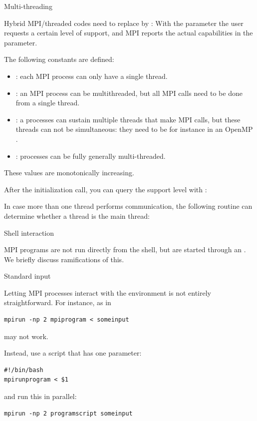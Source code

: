  {Multi-threading}
\label{sec:ref:mpi-thread}

Hybrid MPI/threaded codes need to replace 
by :
%
%
With the  parameter the user requests a certain level of support,
and MPI reports the actual capabilities in the  parameter.

The following constants are defined:
\begin{itemize}
\item {}: each MPI process can only have
  a single thread.
\item {}: an MPI process can be
  multithreaded, but all MPI calls need to be done from a single
  thread.
\item {}: a processes can sustain
  multiple threads that make MPI calls, but these threads can not be
  simultaneous: they need to be for instance in an OpenMP
  .
\item {}: processes can be fully
  generally multi-threaded.
\end{itemize}
These values are monotonically increasing.

After the initialization call, you can query the support level
with :
%

In case more than one thread performs communication, the following routine
can determine whether a thread is the main thread:
%

 {Shell interaction}

MPI programs are not run directly from the shell, but are started
through an . We briefly discuss
ramifications of this.

 {Standard input}
\label{sec:mpi-stdin}

Letting MPI processes interact with the environment is not entirely
straightforward.
For instance,
%
as in
\begin{verbatim}
mpirun -np 2 mpiprogram < someinput
\end{verbatim}
may not work.

Instead, use a script  that has one parameter:
\begin{verbatim}
#!/bin/bash
mpirunprogram < $1
\end{verbatim}
and run this in parallel:
\begin{verbatim}
mpirun -np 2 programscript someinput
\end{verbatim}

